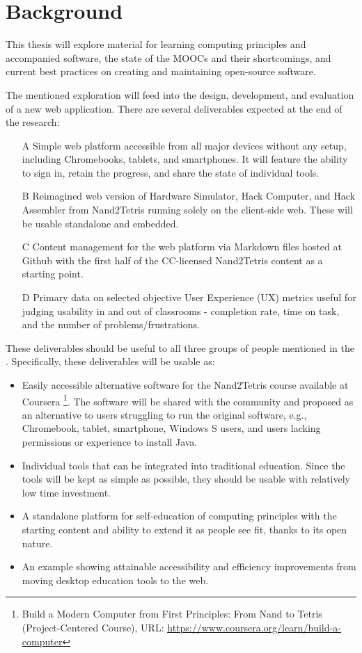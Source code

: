 \chapter{Background}

This thesis will explore material for learning computing principles and accompanied software, the state of the MOOCs and their shortcomings, and current best practices on creating and maintaining open-source software.

The mentioned exploration will feed into the design, development, and evaluation of a new web application.
There are several deliverables expected at the end of the research:

\begin{enumerate}
    \item[A] Simple web platform accessible from all major devices without any setup, including Chromebooks, tablets, and smartphones. It will feature the ability to sign in, retain the progress, and share the state of individual tools.
    \item[B] Reimagined web version of Hardware Simulator, Hack Computer, and Hack Assembler from Nand2Tetris running solely on the client-side web. These will be usable standalone and embedded.
    \item[C] Content management for the web platform via Markdown files hosted at Github with the first half of the CC-licensed Nand2Tetris content as a starting point.
    \item[D] Primary data on selected objective User Experience (UX) metrics useful for judging usability in and out of classrooms - completion rate, time on task, and the number of problems/frustrations. 
\end{enumerate}

These deliverables should be useful to all three groups of people mentioned in the . Specifically, these deliverables will be usable as:

\begin{itemize}
    \item Easily accessible alternative software for the Nand2Tetris course available at Coursera \footnote{Build a Modern Computer from First Principles: From Nand to Tetris (Project-Centered Course), URL: \url{https://www.coursera.org/learn/build-a-computer}}. The software will be shared with the community and proposed as an alternative to users struggling to run the original software, e.g., Chromebook, tablet, smartphone, Windows S users, and users lacking permissions or experience to install Java.
    \item Individual tools that can be integrated into traditional education. Since the tools will be kept as simple as possible, they should be usable with relatively low time investment.
    \item A standalone platform for self-education of computing principles with the starting content and ability to extend it as people see fit, thanks to its open nature.
    \item An example showing attainable accessibility and efficiency improvements from moving desktop education tools to the web.
\end{itemize}
